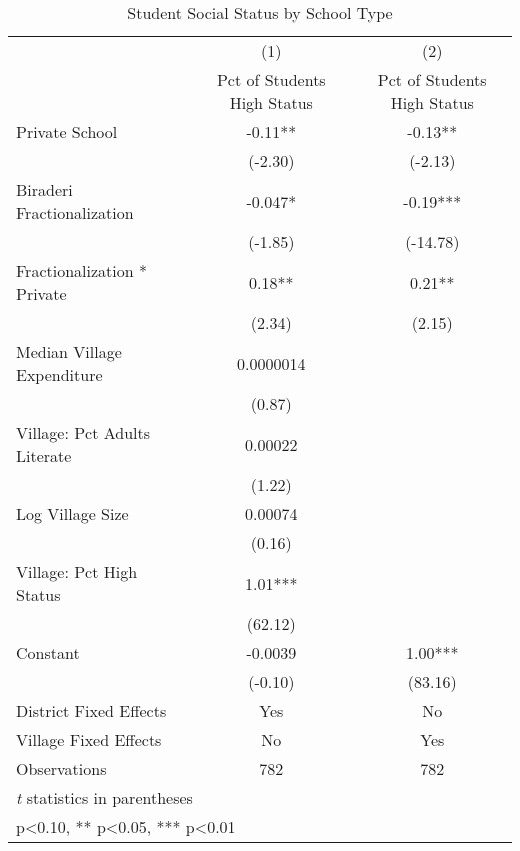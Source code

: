 \begin{table}[htbp]\centering
\def\sym#1{\ifmmode^{#1}\else\(^{#1}\)\fi}
\caption{Student Social Status by School Type\label{highpooling}}
\begin{tabular}{l*{2}{c}}
\toprule
                &\multicolumn{1}{c}{(1)}&\multicolumn{1}{c}{(2)}\\
                &\multicolumn{1}{c}{Pct of Students High Status}&\multicolumn{1}{c}{Pct of Students High Status}\\
\midrule
Private School  &    -0.11** &    -0.13** \\
                &  (-2.30)   &  (-2.13)   \\
Biraderi Fractionalization&   -0.047*  &    -0.19***\\
                &  (-1.85)   & (-14.78)   \\
Fractionalization * Private&     0.18** &     0.21** \\
                &   (2.34)   &   (2.15)   \\
Median Village Expenditure&0.0000014   &            \\
                &   (0.87)   &            \\
Village: Pct Adults Literate&  0.00022   &            \\
                &   (1.22)   &            \\
Log Village Size&  0.00074   &            \\
                &   (0.16)   &            \\
Village: Pct High Status&     1.01***&            \\
                &  (62.12)   &            \\
Constant        &  -0.0039   &     1.00***\\
                &  (-0.10)   &  (83.16)   \\
District Fixed Effects&      Yes   &       No   \\
Village Fixed Effects&       No   &      Yes   \\
\midrule
Observations    &      782   &      782   \\
\bottomrule
\multicolumn{3}{l}{\footnotesize \textit{t} statistics in parentheses}\\
\multicolumn{3}{l}{\footnotesize * p<0.10, ** p<0.05, *** p<0.01}\\
\end{tabular}
\end{table}
